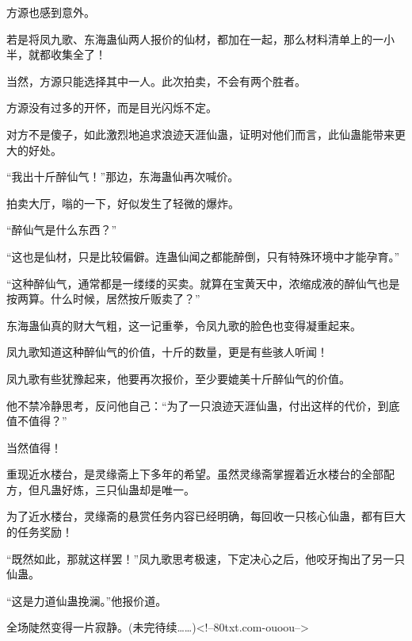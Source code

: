 \begin{this_body}
方源也感到意外。

若是将凤九歌、东海蛊仙两人报价的仙材，都加在一起，那么材料清单上的一小半，就都收集全了！

当然，方源只能选择其中一人。此次拍卖，不会有两个胜者。

方源没有过多的开怀，而是目光闪烁不定。

对方不是傻子，如此激烈地追求浪迹天涯仙蛊，证明对他们而言，此仙蛊能带来更大的好处。

“我出十斤醉仙气！”那边，东海蛊仙再次喊价。

拍卖大厅，嗡的一下，好似发生了轻微的爆炸。

“醉仙气是什么东西？”

“这也是仙材，只是比较偏僻。连蛊仙闻之都能醉倒，只有特殊环境中才能孕育。”

“这种醉仙气，通常都是一缕缕的买卖。就算在宝黄天中，浓缩成液的醉仙气也是按两算。什么时候，居然按斤贩卖了？”

东海蛊仙真的财大气粗，这一记重拳，令凤九歌的脸色也变得凝重起来。

凤九歌知道这种醉仙气的价值，十斤的数量，更是有些骇人听闻！

凤九歌有些犹豫起来，他要再次报价，至少要媲美十斤醉仙气的价值。

他不禁冷静思考，反问他自己：“为了一只浪迹天涯仙蛊，付出这样的代价，到底值不值得？”

当然值得！

重现近水楼台，是灵缘斋上下多年的希望。虽然灵缘斋掌握着近水楼台的全部配方，但凡蛊好炼，三只仙蛊却是唯一。

为了近水楼台，灵缘斋的悬赏任务内容已经明确，每回收一只核心仙蛊，都有巨大的任务奖励！

“既然如此，那就这样罢！”凤九歌思考极速，下定决心之后，他咬牙掏出了另一只仙蛊。

“这是力道仙蛊挽澜。”他报价道。

全场陡然变得一片寂静。(未完待续……)<!--80txt.com-ouoou-->

\end{this_body}

